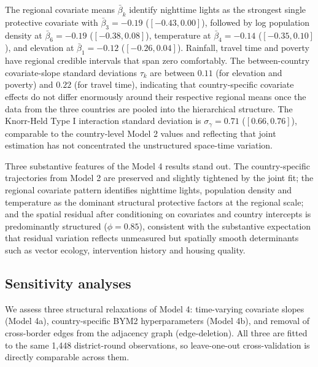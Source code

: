 \documentclass{article}
\begin{document}
The regional covariate means \(\bar{\beta}_k\) identify nighttime lights
as the strongest single protective covariate with
\(\bar{\beta}_3 = -0.19\) (\([-0.43, 0.00]\)), followed by log
population density at \(\bar{\beta}_6 = -0.19\) (\([-0.38, 0.08]\)),
temperature at \(\bar{\beta}_4 = -0.14\) (\([-0.35, 0.10]\)), and
elevation at \(\bar{\beta}_1 = -0.12\) (\([-0.26, 0.04]\)). Rainfall,
travel time and poverty have regional credible intervals that span zero
comfortably. The between-country covariate-slope standard deviations
\(\tau_k\) are between \(0.11\) (for elevation and poverty) and \(0.22\)
(for travel time), indicating that country-specific covariate effects do
not differ enormously around their respective regional means once the
data from the three countries are pooled into the hierarchical
structure. The Knorr-Held Type I interaction standard deviation is
\(\sigma_\gamma = 0.71\) (\([0.66, 0.76]\)), comparable to the
country-level Model 2 values and reflecting that joint estimation has
not concentrated the unstructured space-time variation.

Three substantive features of the Model 4 results stand out. The
country-specific trajectories from Model 2 are preserved and slightly
tightened by the joint fit; the regional covariate pattern identifies
nighttime lights, population density and temperature as the dominant
structural protective factors at the regional scale; and the spatial
residual after conditioning on covariates and country intercepts is
predominantly structured (\(\phi = 0.85\)), consistent with the
substantive expectation that residual variation reflects unmeasured but
spatially smooth determinants such as vector ecology, intervention
history and housing quality.

\subsection{Sensitivity analyses}\label{sensitivity-analyses}

We assess three structural relaxations of Model 4: time-varying
covariate slopes (Model 4a), country-specific BYM2 hyperparameters
(Model 4b), and removal of cross-border edges from the adjacency graph
(edge-deletion). All three are fitted to the same 1,448 district-round
observations, so leave-one-out cross-validation is directly comparable
across them.
\end{document}
